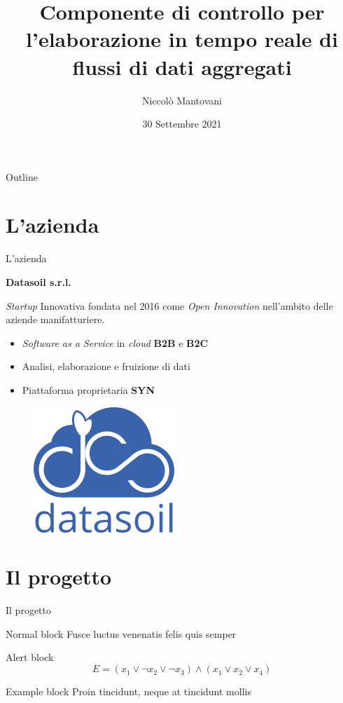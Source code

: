 \documentclass{beamer}
\title{Componente di controllo per l'elaborazione in tempo reale di flussi di dati aggregati}
\author{Niccolò Mantovani}
\date{30 Settembre 2021}
\begin{document}
	\maketitle

	\begin{frame}{Outline}
		\tableofcontents
	\end{frame}


	\section{L'azienda}

	\begin{frame}{L'azienda}

		\textbf{Datasoil s.r.l.} \vspace{.2em}
		
		\textit{Startup} Innovativa fondata nel 2016 come \textit{Open Innovation} nell’ambito delle aziende manifatturiere. \vspace{.2em}
		
		\begin{itemize}
			\item \textit{Software as a Service} in \textit{cloud} \textbf{B2B} e \textbf{B2C} \vspace{.5em}
			\item Analisi, elaborazione e fruizione di dati \vspace{.5em}
			\item Piattaforma proprietaria \textbf{SYN}
		\end{itemize}
		
		\begin{figure}[!h] 
    		\centering 
    		\includegraphics[width=0.2\columnwidth]{../immagini/ds_logo.png}
		\end{figure}

	\end{frame}

	\section{Il progetto}

	\begin{frame}{Il progetto}
		\begin{block}{Normal block}
			Fusce luctus venenatis felis quis semper
		\end{block}

		\begin{alertblock}{Alert block}
			$$ E = (x_1 \vee \neg x_2 \vee \neg x_3) \wedge (x_1 \vee x_2 \vee x_4) $$
		\end{alertblock}

		\begin{exampleblock}{Example block}
			Proin tincidunt, neque at tincidunt mollis
		\end{exampleblock}
	\end{frame}
	
\end{document}
